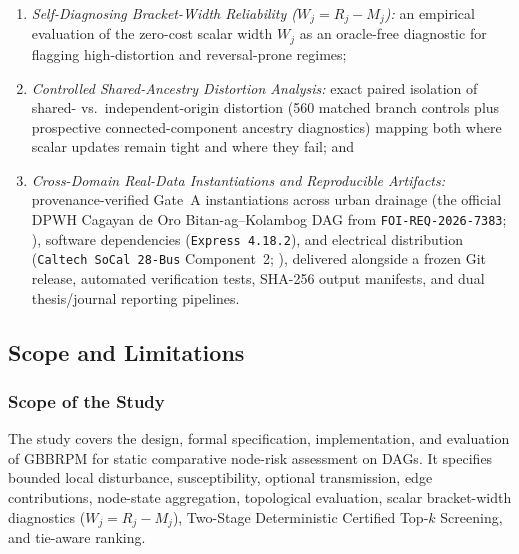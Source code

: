 \begin{enumerate}[label=\arabic*.,leftmargin=*]
\begin{enumerate}[label=(\alph*),leftmargin=*]
Carlo trials;
\item \emph{Self-Diagnosing Bracket-Width Reliability ($W_j = R_j - M_j$):}
an empirical evaluation of the zero-cost scalar width $W_j$ as an oracle-free
diagnostic for flagging high-distortion and reversal-prone regimes;
\item \emph{Controlled Shared-Ancestry Distortion Analysis:} exact paired
isolation of shared- vs.\ independent-origin distortion (560 matched branch
controls plus prospective connected-component ancestry diagnostics) mapping
both where scalar updates remain tight and where they fail; and
\item \emph{Cross-Domain Real-Data Instantiations and Reproducible Artifacts:}
provenance-verified Gate~A instantiations across urban drainage (the official
DPWH Cagayan de Oro Bitan-ag--Kolambog DAG from \texttt{FOI-REQ-2026-7383};
\citealp{dpwh2026foi,upplanades2016}), software dependencies
(\texttt{Express 4.18.2}), and electrical distribution
(\texttt{Caltech SoCal 28-Bus} Component~2; \citealp{xie2025}), delivered
alongside a frozen Git release, automated verification tests, SHA-256 output
manifests, and dual thesis/journal reporting pipelines.
\end{enumerate}
\end{enumerate}

\subsection{Scope and Limitations}\label{scope-and-limitations}

\subsubsection{Scope of the Study}

The study covers the design, formal specification, implementation, and
evaluation of GBBRPM for static comparative node-risk assessment on DAGs. It
specifies bounded local disturbance, susceptibility, optional transmission,
edge contributions, node-state aggregation, topological evaluation, scalar
bracket-width diagnostics ($W_j = R_j - M_j$), Two-Stage Deterministic
Certified Top-$k$ Screening, and tie-aware ranking.

